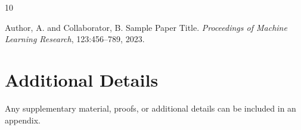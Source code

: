 \documentclass[pmlr]{jmlr} %
\begin{document}

\begin{thebibliography}{10}

Author, A. and Collaborator, B.
\newblock Sample Paper Title.
\newblock \emph{Proceedings of Machine Learning Research}, 123:456--789, 2023.

\end{thebibliography}

\appendix
\section{Additional Details}

Any supplementary material, proofs, or additional details can be
included in an appendix.
\end{document}
